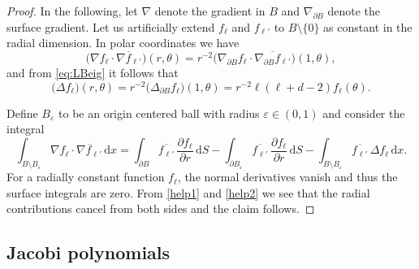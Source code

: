 \documentclass[reqno]{amsart}
\numberwithin{equation}{section}
\numberwithin{figure}{section}
\numberwithin{table}{section}
\theoremstyle{plain}
\theoremstyle{definition}
\theoremstyle{remark}
\newcommand{\di}{\mathrm{d}}   %
\newcommand{\sphe}{{\partial B}}
\begin{document}
\begin{proof}
    In the following, let \( \nabla \) denote the gradient in \( B \) and \( \nabla_\sphe \) denote the surface gradient.
    Let us artificially extend \( f_\ell \) and \( f_{\ell'} \) to \( B \setminus \{ 0 \} \) as constant in the radial dimension.
    In polar coordinates we have
    \begin{equation} \label{help1}
        \big(\nabla f_\ell \cdot \overline{\nabla f_{\ell'}}\big)(r, \theta) = r^{-2} \big(\nabla_\sphe f_\ell \cdot \overline{\nabla_\sphe f_{\ell'}}\big)(1, \theta),
    \end{equation}
    and from \eqref{eq:LBeig} it follows that
    \begin{equation} \label{help2}
        \big(\Delta f_\ell\big)(r, \theta) = r^{-2} \big(\Delta_\sphe f_\ell\big)(1, \theta) = r^{-2} \ell (\ell + d - 2) f_\ell(\theta).
    \end{equation}


    Define \( B_\varepsilon \) to be an origin centered ball with radius \( \varepsilon \in (0, 1) \) and consider the integral
    \begin{equation*}
        \int_{B \setminus B_\varepsilon} \nabla f_\ell \cdot \overline{\nabla f_{\ell'}} \, \di x
        =
        \int_\sphe \overline{f_{\ell'}} \,  \frac{\partial f_\ell}{\partial r} \, \di S - \int_{\sphe_\varepsilon} \overline{f_{\ell'}} \,  \frac{\partial f_\ell}{\partial r} \, \di S - \int_{B \setminus B_\varepsilon} \overline{f_{\ell'}} \,  \Delta f_\ell \, \di x.
    \end{equation*}
    For a radially constant function \( f_\ell \), the normal derivatives vanish and thus the surface integrals are zero.
    From \eqref{help1} and \eqref{help2} we see that the radial contributions cancel from both sides and the claim follows.
\end{proof}
%


\subsection{Jacobi polynomials}
\end{document}
